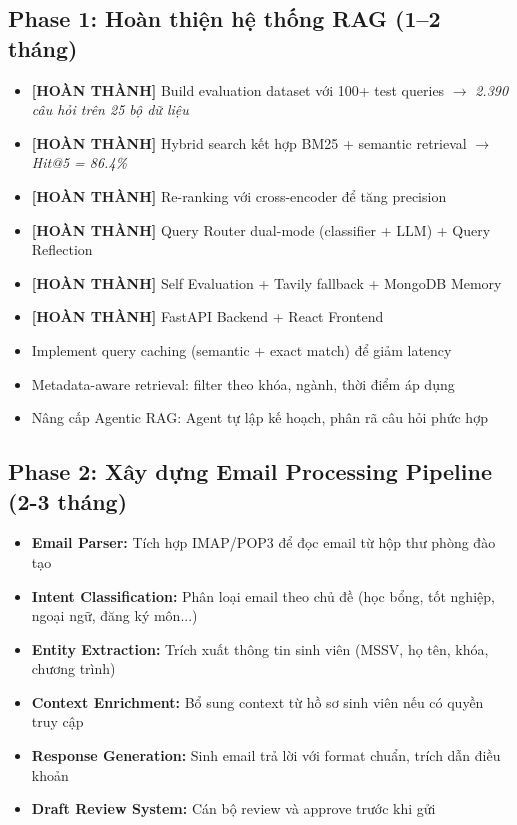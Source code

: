 \documentclass[../DoAn.tex]{subfiles}
\begin{document}
\subsection{Phase 1: Hoàn thiện hệ thống RAG (1--2 tháng)}
\begin{itemize}
    \item \textbf{[HOÀN THÀNH]} Build evaluation dataset với 100+ test queries $\rightarrow$ \textit{2.390 câu hỏi trên 25 bộ dữ liệu}
    \item \textbf{[HOÀN THÀNH]} Hybrid search kết hợp BM25 + semantic retrieval $\rightarrow$ \textit{Hit@5 = 86.4\%}
    \item \textbf{[HOÀN THÀNH]} Re-ranking với cross-encoder để tăng precision
    \item \textbf{[HOÀN THÀNH]} Query Router dual-mode (classifier + LLM) + Query Reflection
    \item \textbf{[HOÀN THÀNH]} Self Evaluation + Tavily fallback + MongoDB Memory
    \item \textbf{[HOÀN THÀNH]} FastAPI Backend + React Frontend
    \item Implement query caching (semantic + exact match) để giảm latency
    \item Metadata-aware retrieval: filter theo khóa, ngành, thời điểm áp dụng
    \item Nâng cấp Agentic RAG: Agent tự lập kế hoạch, phân rã câu hỏi phức hợp
\end{itemize}

\subsection{Phase 2: Xây dựng Email Processing Pipeline (2-3 tháng)}
\begin{itemize}
    \item \textbf{Email Parser:} Tích hợp IMAP/POP3 để đọc email từ hộp thư phòng đào tạo
    \item \textbf{Intent Classification:} Phân loại email theo chủ đề (học bổng, tốt nghiệp, ngoại ngữ, đăng ký môn...)
    \item \textbf{Entity Extraction:} Trích xuất thông tin sinh viên (MSSV, họ tên, khóa, chương trình)
    \item \textbf{Context Enrichment:} Bổ sung context từ hồ sơ sinh viên nếu có quyền truy cập
    \item \textbf{Response Generation:} Sinh email trả lời với format chuẩn, trích dẫn điều khoản
    \item \textbf{Draft Review System:} Cán bộ review và approve trước khi gửi
\end{itemize}
\end{document}
